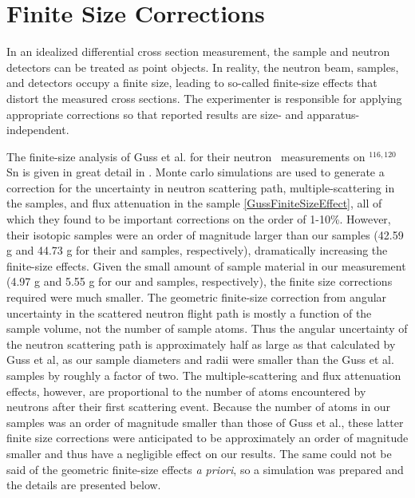 \section{Finite Size Corrections}
In an idealized differential cross section measurement, the sample and neutron
detectors can be treated as point objects. In reality, the neutron beam,
samples, and detectors occupy a finite size, leading to so-called finite-size
effects that distort the measured cross sections. The experimenter is responsible
for applying appropriate corrections so that reported results are size- and
apparatus-independent.

The finite-size analysis of Guss et al. for
their neutron \el\ measurements on $^{116,120}$Sn is given in great detail in
\cite{GussPhDThesis}. Monte carlo simulations are used to generate a correction
for the uncertainty in neutron scattering path, multiple-scattering
in the samples, and flux attenuation in the sample \ref{GussFiniteSizeEffect},
all of which they found to be important corrections on the order of 1-10\%.
However, their isotopic samples were an order of magnitude larger than our
samples (42.59 g and 44.73 g for their \snSixteen and \snTwenty samples,
respectively), dramatically increasing the finite-size effects. Given the small amount of sample 
material in our measurement (4.97 g and 5.55 g for our \snTwelve and \snFour
samples, respectively), the finite size corrections required were much
smaller. The geometric finite-size correction from angular uncertainty in the
scattered neutron flight path is mostly a function of the sample volume,
not the number of sample atoms. Thus the angular uncertainty of the neutron
scattering path is approximately half as large as that calculated by Guss et al,
as our sample diameters and radii were smaller than the Guss et al. samples
by roughly a factor of two. The multiple-scattering and flux attenuation
effects, however, are proportional to the number of atoms
encountered by neutrons after their first scattering event. Because the number
of atoms in our samples was an order of magnitude smaller than those of Guss et
al., these latter finite size corrections were anticipated to be approximately
an order of magnitude smaller and thus have a negligible effect on our results.
The same could not be said of the geometric finite-size effects \textit{a
priori}, so a simulation was prepared and the details are presented below.

